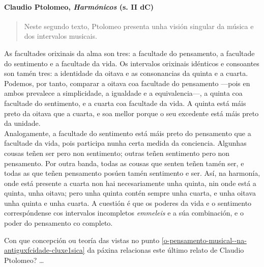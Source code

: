\paragraph{\texorpdfstring{Claudio Ptolomeo, \emph{Harmónicos} (s. II
dC)}{Claudio Ptolomeo, Harmónicos (s. II dC)}}

\begin{quote}
Neste segundo texto, Ptolomeo presenta unha visión singular da música e dos intervalos musicais.
\end{quote}


\begin{multicols}{3}
\setlength{\columnseprule}{1pt}
{\small
\noindent
As facultades orixinais da alma son tres: a facultade do pensamento, a facultade do sentimento e a facultade da vida. Os intervalos orixinais idénticos e consoantes son tamén tres: a identidade da oitava e as consonancias da quinta e a cuarta. Podemos, por tanto, comparar a oitava coa facultade do pensamento ---pois en ambos prevalece a simplicidade, a
igualdade e a equivalencia---, a quinta coa facultade do sentimento, e a cuarta coa facultade da vida. A quinta está máis preto da oitava que a cuarta, e soa mellor porque o seu excedente está máis preto da unidade.\\
Analogamente, a facultade do sentimento está máis preto do pensamento que a facultade da vida, pois participa nunha certa medida da conciencia. Algunhas cousas teñen ser pero non sentimento; outras teñen sentimento pero non pensamento. Por outra banda, todas as cousas que senten teñen tamén ser, e todas as que teñen pensamento posúen tamén sentimento e ser. Así, na harmonía, onde está presente a cuarta non hai necesariamente unha quinta, nin onde está a quinta, unha oitava; pero unha quinta contén sempre unha cuarta, e unha oitava unha quinta e unha cuarta. A cuestión é que os poderes da vida e o sentimento correspóndense cos intervalos incompletos \emph{emmeleis} e a súa combinación, e o poder do pensamento co completo.
}
\end{multicols}

\begin{ejercicio}[]
Con que concepción ou teoría das vistas no punto \ref{o-pensamento-musical--na-antiguxfcidade-cluxe1sica} da páxina \pageref{o-pensamento-musical--na-antiguxfcidade-cluxe1sica} relacionas este último relato de Claudio Ptolomeo? \ldots
 \vspace*{0.50cm} %
\end{ejercicio}
%

